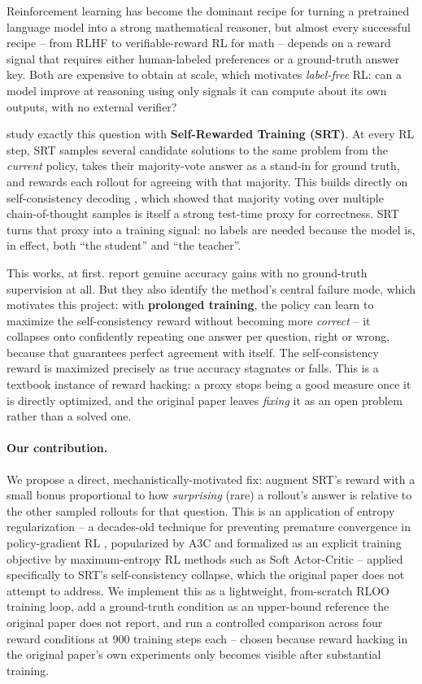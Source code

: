 \documentclass{article}
\begin{document}
Reinforcement learning has become the dominant recipe for turning a
pretrained language model into a strong mathematical reasoner, but almost
every successful recipe -- from RLHF to verifiable-reward RL for math --
depends on a reward signal that requires either human-labeled preferences or
a ground-truth answer key. Both are expensive to obtain at scale, which
motivates \emph{label-free} RL: can a model improve at reasoning using only
signals it can compute about its own outputs, with no external verifier?

\citet{shafayat2025srt} study exactly this question with \textbf{Self-Rewarded
Training (SRT)}. At every RL step, SRT samples several candidate solutions to
the same problem from the \emph{current} policy, takes their majority-vote
answer as a stand-in for ground truth, and rewards each rollout for agreeing
with that majority. This builds directly on self-consistency decoding
\citep{wang2022selfconsistency}, which showed that majority voting over
multiple chain-of-thought samples is itself a strong test-time proxy for
correctness. SRT turns that proxy into a training signal: no labels are
needed because the model is, in effect, both ``the student'' and ``the teacher''.

This works, at first. \citeauthor{shafayat2025srt} report genuine accuracy
gains with no ground-truth supervision at all. But they also identify the
method's central failure mode, which motivates this project: with
\textbf{prolonged training}, the policy can learn to maximize the
self-consistency reward without becoming more \emph{correct} -- it collapses
onto confidently repeating one answer per question, right or wrong, because
that guarantees perfect agreement with itself. The self-consistency reward is
maximized precisely as true accuracy stagnates or falls. This is a textbook
instance of reward hacking: a proxy stops being a good measure once it is
directly optimized, and the original paper leaves \emph{fixing} it as an
open problem rather than a solved one.

\paragraph{Our contribution.} We propose a direct, mechanistically-motivated
fix: augment SRT's reward with a small bonus proportional to how
\emph{surprising} (rare) a rollout's answer is relative to the other sampled
rollouts for that question. This is an application of entropy regularization
-- a decades-old technique for preventing premature convergence in
policy-gradient RL \citep{williams1991function}, popularized by A3C
\citep{mnih2016a3c} and formalized as an explicit training objective by
maximum-entropy RL methods such as Soft Actor-Critic
\citep{haarnoja2018sac} -- applied specifically to SRT's self-consistency
collapse, which the original paper does not attempt to address. We implement
this as a lightweight, from-scratch RLOO \citep{kool2019buy,ahmadian2024back}
training loop, add a ground-truth condition as an upper-bound
reference the original paper does not report, and run a controlled
comparison across four reward conditions at 900 training steps each --
chosen because reward hacking in the original paper's own experiments only
becomes visible after substantial training.
\end{document}

